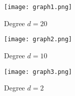 \documentclass[a4paper, 12pt]{article}
\begin{document}
\begin{figure}[H]
    \centering
    \texttt{[image: graph1.png]}
    \caption{Degree $d=20$}
\end{figure}

\begin{figure}[H]
    \centering
    \texttt{[image: graph2.png]}
    \caption{Degree $d=10$}
\end{figure}

\begin{figure}[H]
    \centering
    \texttt{[image: graph3.png]}
    \caption{Degree $d=2$}
\end{figure}
\end{document}
